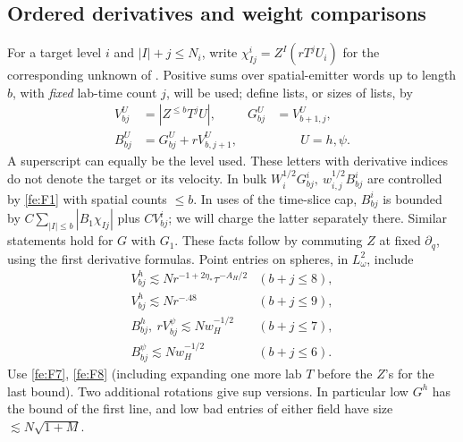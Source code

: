 \subsection{Ordered derivatives and weight comparisons}
For a target level $i$ and $|I|+j\le N_i$, write
$\chi^i_{Ij}=Z^I(rT^jU_i)$ for the corresponding unknown of
.  Positive sums over spatial-emitter words up to
length $b$, with \emph{fixed} lab-time count $j$, will be used; define
lists, or sizes of lists, by
\begin{equation}
\label{fs:lists}
\begin{aligned}
 V^U_{b j}&=|Z^{\le b}T^j U|,
 &G^U_{b j}&=V^U_{b+1,j},\\
 B^U_{b j}&=G^U_{b j}+r V^U_{b,j+1},
 &&\qquad U=h,\psi .
\end{aligned}
\end{equation}
A superscript can equally be the level used. These letters with derivative indices do not denote the target or its velocity. In bulk \(W_i^{1/2}G^i_{b j},\ w_{i,j}^{1/2}B^i_{b j}\) are controlled by \eqref{fe:F1} with spatial counts \(\le b\). In uses of the time-slice cap, \(B^i_{b j}\) is bounded by \(C\sum_{|I|\le b}|B_1\chi_{I j}|\) plus \(C V^i_{b j}\); we will charge the latter separately there. Similar statements hold for \(G\) with \(G_1\). These facts follow by commuting \(Z\) at fixed \(\partial_q\), using the first derivative formulas. Point entries on spheres, in \(L^2_\omega\), include
\begin{equation}
\label{fs:G1}
\begin{array}{ll}
 V^h_{b j}\lesssim N r^{-1+2\eta_*}\tau^{-A_H/2}&(b+j\le8),\\
 V^h_{b j}\lesssim N r^{-.48}&(b+j\le9),\\
 B^h_{b j},\ r V^\psi_{b j}\lesssim N w_H^{-1/2}&(b+j\le7),\\
 B^\psi_{b j}\lesssim N w_H^{-1/2}&(b+j\le6).
\end{array}
\end{equation}
Use \eqref{fe:F7}, \eqref{fe:F8} (including expanding one more lab \(T\) before the \(Z\)'s for the last bound). Two additional rotations give sup versions. In particular low \(G^h\) has the bound of the first line, and low bad entries of either field have size \(\lesssim N\sqrt{1+M}\).

